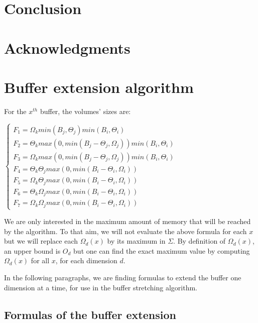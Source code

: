 \documentclass[conference]{IEEEtran}
\begin{document}
\section{Conclusion}

\section{Acknowledgments}




\appendices

\section{Buffer extension algorithm}
\label{bufferExtensionAlgorithm}

For the $x^{th}$ buffer, the volumes' sizes are:

$\begin{cases}
F_1 = \Omega_k min(B_j, \Theta_j) min(B_i, \Theta_i) \\
F_2 = \Theta_k max(0, min(B_j - \Theta_j, \Omega_j)) min(B_i, \Theta_i) \\
F_3 = \Omega_k max(0, min(B_j - \Theta_j, \Omega_j)) min(B_i, \Theta_i) \\
F_4 = \Theta_k \Theta_j max(0, min(B_i-\Theta_i, \Omega_i)) \\
F_5 = \Omega_k \Theta_j max(0, min(B_i-\Theta_i, \Omega_i)) \\
F_6 = \Theta_k \Omega_j max(0, min(B_i-\Theta_i, \Omega_i)) \\
F_7 = \Omega_k \Omega_j max(0, min(B_i-\Theta_i, \Omega_i))
\end{cases}$

We are only interested in the maximum amount of memory that will be reached by
the algorithm. To that aim, we will not evaluate the above formula for each $x$
but we will replace each $\Omega_d(x)$ by its maximum in $\Sigma$. By definition
of $\Omega_d(x)$, an upper bound is $O_d$ but one can find the exact maximum
value by computing $\Omega_d(x)$ for all $x$, for each dimension $d$.

In the following paragraphs, we are finding formulas to extend the buffer one
dimension at a time, for use in the buffer stretching algorithm.

\subsection{Formulas of the buffer extension}
\end{document}
